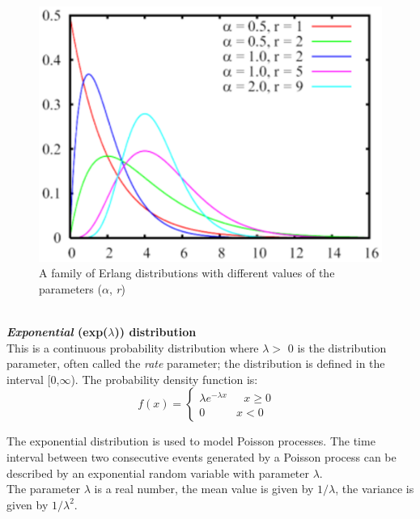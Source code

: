 \begin{figure}[htb]
    \begin{center}
        \includegraphics[scale=.5]{img/jsimg/4.4.eps}
    \end{center}
    \caption{A family of Erlang distributions with different values of the
    parameters ($\alpha$, \emph{r})}
    \label{fig:famErl}
\end{figure}\\


\textbf{\emph{Exponential} (exp($\lambda$)) distribution}\\
 This
is a continuous probability distribution where $\lambda >$ 0 is
the distribution parameter, often called the \emph{rate}
parameter; the distribution is defined in the interval
[0,$\infty$). The probability density function is:
\[ f(x) = \left\{ \begin{array} {ll}
          \lambda e^{- \lambda x}   &   \mbox{ $x \geq 0$ } \\
          0   &   \mbox{$x < 0$}
                 \end {array}
\right.   \]

The exponential distribution is used to model Poisson processes.
The time interval between two consecutive events generated by a
Poisson process can be described by an exponential random variable
with parameter $\lambda$.\\
The parameter $\lambda$ is a real number, the mean value is
 given by $1/\lambda$, the variance is given by $1/\lambda^2$.

